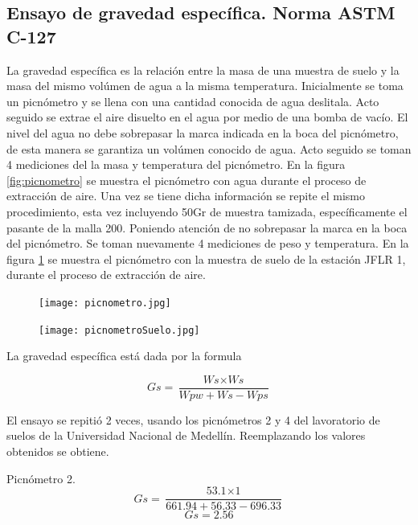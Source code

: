 \subsection{Ensayo de gravedad espec\'ifica. Norma ASTM C-127}
La gravedad espec\'ifica es la relaci\'on entre la masa de una muestra de suelo y la masa del mismo vol\'umen de agua a la misma temperatura.
Inicialmente se toma un picn\'ometro y se llena con una cantidad conocida de agua deslitala. Acto seguido se extrae el aire disuelto en el agua por medio de una bomba de vac\'io.
El nivel del agua no debe sobrepasar la marca indicada en la boca del picn\'ometro, de esta manera se garantiza un vol\'umen conocido de agua. Acto seguido se toman 4 mediciones del la masa y temperatura del picn\'ometro. En la figura \ref{fig:picnometro} se muestra el picn\'ometro con agua durante el proceso de extracci\'on de aire.
Una vez se tiene dicha informaci\'on se repite el mismo procedimiento, esta vez incluyendo 50Gr de muestra tamizada, espec\'ificamente el pasante de la malla 200. Poniendo atenci\'on de no sobrepasar la marca en la boca del picn\'ometro.
Se toman nuevamente 4 mediciones de peso y temperatura. En la figura \ref{fig:picnometroSuelo} se muestra el picn\'ometro con la muestra de suelo de la estaci\'on JFLR 1, durante el proceso de extracci\'on de aire.

\begin{figure}[]
\centering
\begin{minipage}{.45\linewidth}
  \texttt{[image: picnometro.jpg]}
  \label{fig:picnometro}
\end{minipage}
\hspace{.05\linewidth}
\begin{minipage}{.45\linewidth}
  \texttt{[image: picnometroSuelo.jpg]}
  \label{fig:picnometroSuelo}
\end{minipage}


\end{figure}


La gravedad espec\'ifica est\'a dada por la formula

$$Gs =\frac{\textit{Ws}  \times \textit{Ws} }{\textit{Wpw}   + \textit{Ws}- \textit{Wps}}    $$

El ensayo se repiti\'o 2 veces, usando los picn\'ometros 2 y 4 del lavoratorio de suelos de la Universidad Nacional de Medell\'in. Reemplazando los valores obtenidos se obtiene.

Picn\'ometro 2.
$$Gs =\frac{\textit{53.1}  \times \textit{1} }{\textit{661.94}   + \textit{56.33}- \textit{696.33}}    $$
$$Gs =2.56   $$

